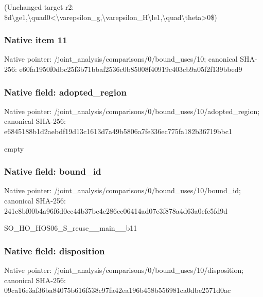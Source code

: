 \documentclass[10pt,a4paper]{article}
\begin{document}
\begingroup\raggedright\sloppy (Unchanged target r2:\allowbreak{} \$d\textbackslash{}ge1,\allowbreak{}\textbackslash{}quad0<\textbackslash{}varepsilon\_\allowbreak{}g,\allowbreak{}\textbackslash{}varepsilon\_\allowbreak{}H\textbackslash{}le1,\allowbreak{}\textbackslash{}quad\textbackslash{}theta>0\$)\par\endgroup

\subsubsection{Native item 11}
Native pointer: /joint\_\allowbreak{}analysis/comparisons/0/bound\_\allowbreak{}uses/10; canonical SHA-256: e60fa1950f0dbc25f3b71bbaf2536c0b85008f40919c403cb9a05f2f139bbed9

\subsubsection{Native field: adopted\_\allowbreak{}region}
Native pointer: /joint\_\allowbreak{}analysis/comparisons/0/bound\_\allowbreak{}uses/10/adopted\_\allowbreak{}region; canonical SHA-256: e6845188b1d2aebdf19d13c1613d7a49b5806a7fe336ec775fa182b36719bbc1

\begingroup\raggedright\sloppy empty\par\endgroup

\subsubsection{Native field: bound\_\allowbreak{}id}
Native pointer: /joint\_\allowbreak{}analysis/comparisons/0/bound\_\allowbreak{}uses/10/bound\_\allowbreak{}id; canonical SHA-256: 241c8bf00b4a96f6d0cc44b37be4e286cc06414ad07e3f878a4d63a0efc5fd9d

\begingroup\raggedright\sloppy SO\_\allowbreak{}HO\_\allowbreak{}HOS06\_\allowbreak{}S\_\allowbreak{}reuse\_\allowbreak{}\_\allowbreak{}main\_\allowbreak{}\_\allowbreak{}b11\par\endgroup

\subsubsection{Native field: disposition}
Native pointer: /joint\_\allowbreak{}analysis/comparisons/0/bound\_\allowbreak{}uses/10/disposition; canonical SHA-256: 09ca16e3af36ba84075b616f538c97fa42ea196b458b556981ca0dbe2571d0ac
\end{document}
